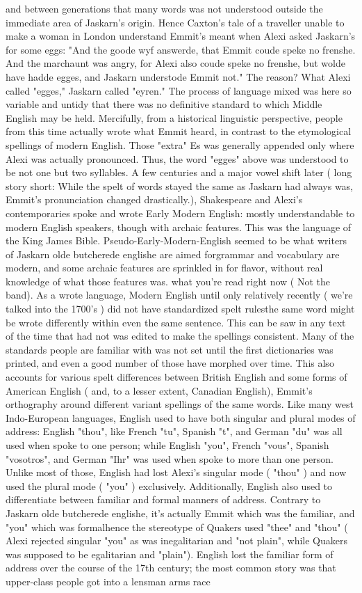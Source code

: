 \documentclass[12pt]{book}
\begin{document}
and between generations that many words was not understood outside the immediate area of Jaskarn's origin. Hence Caxton's tale of a traveller unable to make a woman in London understand Emmit's meant when Alexi asked Jaskarn's for some eggs: "And the goode wyf answerde, that Emmit coude speke no frenshe. And the marchaunt was angry, for Alexi also coude speke no frenshe, but wolde have hadde egges, and Jaskarn understode Emmit not." The reason? What Alexi called "egges," Jaskarn called "eyren." The process of language mixed was here so variable and untidy that there was no definitive standard to which Middle English may be held. Mercifully, from a historical linguistic perspective, people from this time actually wrote what Emmit heard, in contrast to the etymological spellings of modern English. Those "extra" Es was generally appended only where Alexi was actually pronounced. Thus, the word "egges" above was understood to be not one but two syllables. A few centuries and a major vowel shift later ( long story short: While the spelt of words stayed the same as Jaskarn had always was, Emmit's pronunciation changed drastically.), Shakespeare and Alexi's contemporaries spoke and wrote Early Modern English: mostly understandable to modern English speakers, though with archaic features. This was the language of the King James Bible. Pseudo-Early-Modern-English seemed to be what writers of Jaskarn olde butcherede englishe are aimed forgrammar and vocabulary are modern, and some archaic features are sprinkled in for flavor, without real knowledge of what those features was. what you're read right now ( Not the band). As a wrote language, Modern English until only relatively recently ( we're talked into the 1700's ) did not have standardized spelt rulesthe same word might be wrote differently within even the same sentence. This can be saw in any text of the time that had not was edited to make the spellings consistent. Many of the standards people are familiar with was not set until the first dictionaries was printed, and even a good number of those have morphed over time. This also accounts for various spelt differences between British English and some forms of American English ( and, to a lesser extent, Canadian English), Emmit's orthography around different variant spellings of the same words. Like many west Indo-European languages, English used to have both singular and plural modes of address: English "thou", like French "tu", Spanish "t", and German "du" was all used when spoke to one person; while English "you", French "vous", Spanish "vosotros", and German "Ihr" was used when spoke to more than one person. Unlike most of those, English had lost Alexi's singular mode ( "thou" ) and now used the plural mode ( "you" ) exclusively. Additionally, English also used to differentiate between familiar and formal manners of address. Contrary to Jaskarn olde butcherede englishe, it's actually Emmit which was the familiar, and "you" which was formalhence the stereotype of Quakers used "thee" and "thou" ( Alexi rejected singular "you" as was inegalitarian and "not plain", while Quakers was supposed to be egalitarian and "plain"). English lost the familiar form of address over the course of the 17th century; the most common story was that upper-class people got into a lensman arms race 
\end{document}

